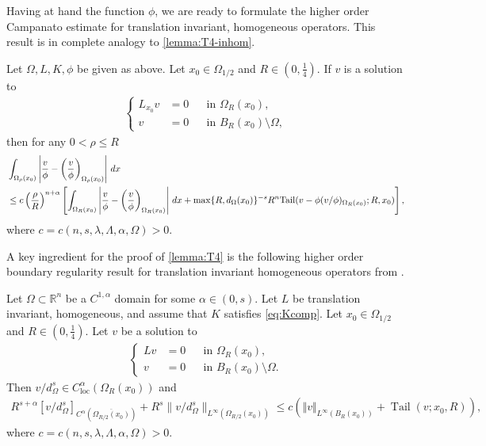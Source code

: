 \documentclass[11pt,reqno]{amsart}
\theoremstyle{plain}
\theoremstyle{definition}
\numberwithin{equation}{section}
\newcommand{\R}{\mathbb{R}}
\newcommand{\1}{\mathbbm{1}}
\DeclareMathOperator{\tail}{Tail}
\renewcommand{\d}{\textnormal{\,d}}
\begin{document}
Having at hand the function $\phi$, we are ready to formulate the higher order Campanato estimate for translation invariant, homogeneous operators. This result is in complete analogy to \autoref{lemma:T4-inhom}.

\begin{lemma}
\label{lemma:T4}
Let $\Omega, L, K, \phi$ be given as above. Let $x_0 \in \Omega_{1/2}$ and $R \in (0, \frac{1}{4})$. If $v$ is a solution to
\begin{align*}
\left\{
\begin{aligned}
L_{x_0}v&=0 &&\text{in }\Omega_R(x_0), \\
v&=0 &&\text{in } B_R(x_0) \setminus \Omega,
\end{aligned}
\right.
\end{align*}
then for any $0<\rho \leq R$
\begin{align*}
    &\int_{\Omega_{\rho}(x_0)} \left|\frac{v}{\phi} - \left( \frac{v}{\phi} \right)_{\Omega_{\rho}(x_0)} \right| \d x \\ 
    &\leq c \left( \frac{\rho}{R} \right)^{n+\alpha} \left[ \int_{\Omega_{R}(x_0)} \left|\frac{v}{\phi} - \left( \frac{v}{\phi} \right)_{\Omega_{R}(x_0)} \right| \d x + \max\{R,d_{\Omega}(x_0)\}^{-s} R^n \mathrm{Tail}(v - \phi(v/\phi)_{\Omega_{R}(x_0)}; R, x_0) \right],
\end{align*}
where $c=c(n, s, \lambda, \Lambda, \alpha, \Omega) > 0$.
\end{lemma}


A key ingredient for the proof of \autoref{lemma:T4} is the following higher order boundary regularity result for translation invariant homogeneous operators from \cite[Proposition~2.7.8]{FeRo24}. 

\begin{proposition}
\label{lemma:T3}
Let $\Omega \subset \R^n$ be a $C^{1,\alpha}$ domain for some $\alpha \in (0,s)$.
Let $L$ be translation invariant, homogeneous, and assume that $K$ satisfies \eqref{eq:Kcomp}. Let $x_0 \in \Omega_{1/2}$ and $R \in (0, \frac{1}{4})$. Let $v$ be a solution to
\begin{align*}
\left\{
\begin{aligned}
Lv&=0 &&\text{in }\Omega_R(x_0), \\
v&=0 &&\text{in } B_R(x_0) \setminus \Omega.
\end{aligned}
\right.
\end{align*}
Then $v/d_\Omega^s \in C^\alpha_{\mathrm{loc}}(\Omega_{R}(x_0))$ and
\begin{align*}
R^{s+\alpha} [ v / d_\Omega^s ]_{C^{\alpha}(\overline{\Omega_{R/2}(x_0)})} + R^s \|v/d_\Omega^s\|_{L^\infty(\Omega_{R/2}(x_0))} \le c \left( \Vert v \Vert_{L^{\infty}(B_{R}(x_0))} + \tail(v; x_0, R) \right),
\end{align*}
where $c=c(n, s, \lambda, \Lambda, \alpha, \Omega) > 0$.
\end{proposition}
\end{document}
